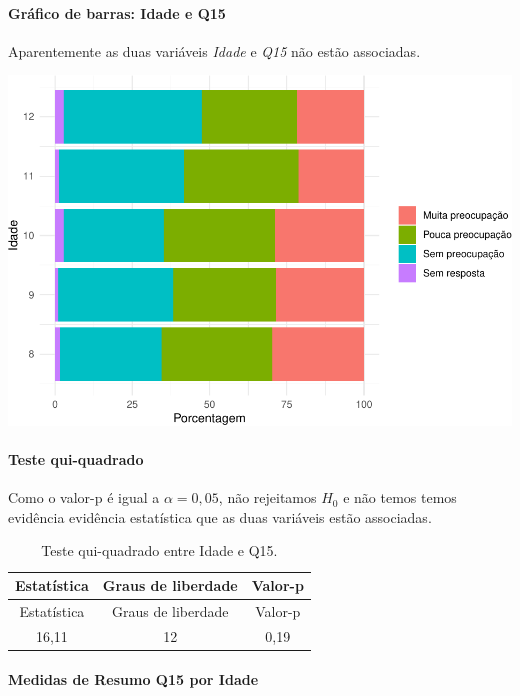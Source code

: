 \documentclass[]{article}
\let\oldparagraph\paragraph
\renewcommand{\paragraph}[1]{\oldparagraph{#1}\mbox{}}
\begin{document}
\hypertarget{gruxe1fico-de-barras-idade-e-q15}{%
\paragraph{Gráfico de barras: Idade e Q15}\label{gruxe1fico-de-barras-idade-e-q15}}

Aparentemente as duas variáveis \emph{Idade} e \emph{Q15} não estão associadas.

\begin{center}\includegraphics[width=0.75\linewidth]{relatorio_files/figure-latex/unnamed-chunk-113-1} \end{center}

\hypertarget{teste-qui-quadrado-9}{%
\paragraph{Teste qui-quadrado}\label{teste-qui-quadrado-9}}

Como o valor-p é igual a \(\alpha=0,05\), não rejeitamos \(H_0\) e não temos temos evidência evidência estatística que as duas variáveis estão associadas.

\begin{longtable}[]{@{}ccc@{}}
\caption{\label{tab:unnamed-chunk-114}Teste qui-quadrado entre Idade e Q15.}\tabularnewline
\toprule
Estatística & Graus de liberdade & Valor-p\tabularnewline
\midrule
\endfirsthead
\toprule
Estatística & Graus de liberdade & Valor-p\tabularnewline
\midrule
\endhead
16,11 & 12 & 0,19\tabularnewline
\bottomrule
\end{longtable}

\cleardoublepage

\hypertarget{medidas-de-resumo-q15-por-idade}{%
\paragraph{Medidas de Resumo Q15 por Idade}\label{medidas-de-resumo-q15-por-idade}}
\end{document}
